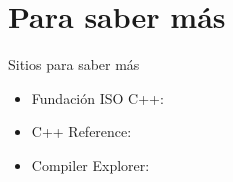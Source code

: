 \section{Para saber más}

\begin{frame}[t]{Sitios para saber más}
\begin{itemize}
  \item Fundación ISO C++: 
  
  \vfill
  \item C++ Reference: 

  \vfill
  \item Compiler Explorer: 
\end{itemize}
\end{frame}

